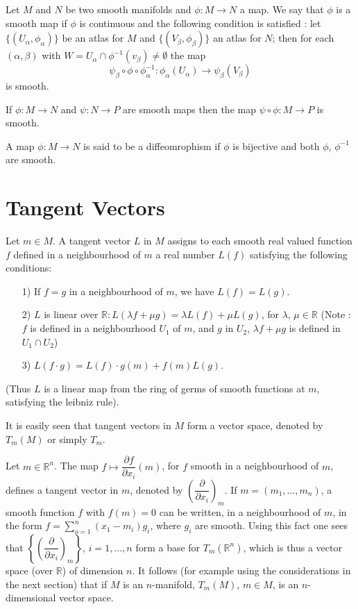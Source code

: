 Let $M$ and $N$ be two smooth manifolds and $\phi:M\to N$ a map. We say that $\phi$ is a smooth map if $\phi$ is continuous and the following condition is satisfied : let $\{(U_{\alpha},\phi_{\alpha})\}$ be an atlas for $M$ and $\{(V_{\beta},\phi_{\beta})\}$ an atlas for $N$; then for each $(\alpha,\beta)$ with $W=U_{\alpha}\cap \phi^{-1}(v_{\beta})\neq \emptyset$ the map
$$
\psi_{\beta}\circ \phi \circ \phi^{-1}_{\alpha} :\phi_{\alpha}(U_{\alpha})\to \psi_{\beta}(V_{\beta})
$$
is smooth.

If $\phi:M\to N$ and $\psi : N\to P$ are smooth maps then the map $\psi\circ \phi:M\to P$ is smooth.

A map $\phi:M\to N$ is said to be a diffeomrophism if $\phi$ is bijective and both $\phi$, $\phi^{-1}$ are smooth.

\section*{Tangent Vectors}
\pageoriginale

Let $m\in M$. A tangent vector $L$ in $M$ assigns to each smooth real valued function $f$ defined in a neighbourhood of $m$ a real number $L(f)$ satisfying the following conditions:
\begin{itemize}
\item[1)] If $f=g$ in a neighbourhood of $m$, we have $L(f)=L(g)$.

\item[2)] $L$ is linear over $\mathbb{R}:L(\lambda f+\mu g)=\lambda L(f)+\mu L(g)$, for $\lambda$, $\mu\in \mathbb{R}$ (Note : $f$ is defined in a neighbourhood $U_{1}$ of $m$, and $g$ in $U_{2}$, $\lambda f+\mu g$ is defined in $U_{1}\cap U_{2}$)

\item[3)] $L(f\cdot g)=L(f)\cdot g(m)+f(m)L(g)$.
\end{itemize}

(Thus $L$ is a linear map from the ring of germs of smooth functions at $m$, satisfying the leibniz rule).

It is easily seen that tangent vectors in $M$ form a vector space, denoted by $T_{m}(M)$ or simply $T_{m}$.

Let $m\in \mathbb{R}^{n}$. The map $f\mapsto \dfrac{\partial f}{\partial x_{i}}(m)$, for $f$ smooth in a neighbourhood of $m$, defines a tangent vector in $m$, denoted by $\left(\dfrac{\partial}{\partial x_{i}}\right)_{m}$. If $m=(m_{1},\ldots,m_{n})$, a smooth function $f$ with $f(m)=0$ can be written, in a neighbourhood of $m$, in the form $f=\sum\limits^{n}_{o=1}(x_{1}-m_{i})g_{i}$, where $g_{i}$ are smooth. Using this fact one sees that $\left\{\left(\dfrac{\partial}{\partial x_{i}}\right)_{m}\right\}$, $i=1,\ldots,n$ form a base for $T_{m}(\mathbb{R}^{n})$, which is thus a vector space (over $\mathbb{R}$) of dimension $n$. It follows (for example using the considerations in the next section) that if $M$ is an $n$-manifold, $T_{m}(M)$, $m\in M$, is an $n$-dimensional vector space.


